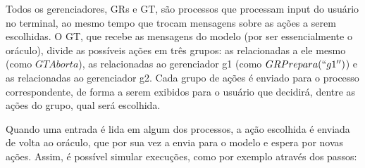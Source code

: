 Todos os gerenciadores, GRs e GT, são processos que processam input do usuário
no terminal, ao mesmo tempo que trocam mensagens sobre as ações a serem
escolhidas. O GT, que recebe as mensagens do modelo (por ser essencialmente o
oráculo), divide as possíveis ações em três grupos: as relacionadas a ele mesmo
(como $GTAborta$), as relacionadas ao gerenciador g1 (como $GRPrepara(``g1'')$)
e as relacionadas ao gerenciador g2. Cada grupo de ações é enviado para o
processo correspondente, de forma a serem exibidos para o usuário que decidirá,
dentre as ações do grupo, qual será escolhida.

Quando uma entrada é lida em algum dos processos, a ação escolhida é enviada de
volta ao oráculo, que por sua vez a envia para o modelo e espera por novas
ações. Assim, é possível simular execuções, como por exemplo através dos passos:

